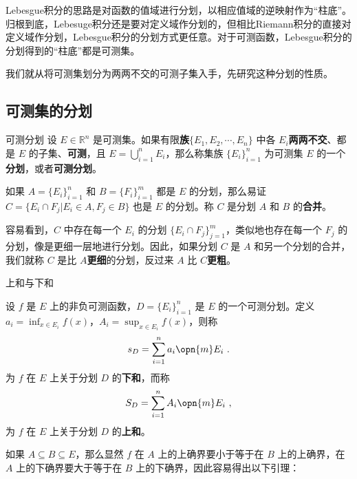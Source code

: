 

Lebesgue积分的思路是对函数的值域进行分划，以相应值域的逆映射作为“柱底”。归根到底，Lebesuge积分还是要对定义域作分划的，但相比Riemann积分的直接对定义域作分划，Lebesgue积分的分划方式更任意。对于可测函数，Lebesgue积分的分划得到的“柱底”都是可测集。

我们就从将可测集划分为两两不交的可测子集入手，先研究这种分划的性质。

\subsection{可测集的分划}



\begin{definition}{可测分划}
设 $E\in\mathbb{R}^n$ 是可测集。如果有限\textbf{族}$\{E_1, E_2, \cdots, E_n\}$ 中各 $E_i$\textbf{两两不交}、都是 $E$ 的子集、\textbf{可测}，且 $E=\bigcup^n_{i=1}E_i$，那么称集族 $\{E_i\}_{i=1}^n$ 为可测集 $E$ 的一个\textbf{分划}，或者\textbf{可测分划}。
\end{definition}

如果 $A=\{E_i\}_{i=1}^n$ 和 $B=\{F_i\}_{i=1}^m$ 都是 $E$ 的分划，那么易证 $C=\{E_i\cap F_j|E_i\in A, F_j\in B\}$ 也是 $E$ 的分划。称 $C$ 是分划 $A$ 和 $B$ 的\textbf{合并}。

容易看到，$C$ 中存在每一个 $E_i$ 的分划 $\{E_i\cap F_j\}_{j=1}^m$，类似地也存在每一个 $F_j$ 的分划，像是更细一层地进行分划。因此，如果分划 $C$ 是 $A$ 和另一个分划的合并，我们就称 $C$ 是比 $A$\textbf{更细}的分划，反过来 $A$ 比 $C$\textbf{更粗}。

\begin{definition}{上和与下和}

设 $f$ 是 $E$ 上的非负可测函数，$D=\{E_i\}_{i=1}^n$ 是 $E$ 的一个可测分划。定义 $a_i=\inf_{x\in E_i}f(x)$，$A_i=\sup_{x\in E_i}f(x)$，则称
\begin{equation}
s_D=\sum_{i=1}^n a_i \opn{m}E_i~.
\end{equation}
为 $f$ 在 $E$ 上关于分划 $D$ 的\textbf{下和}，而称
\begin{equation}
S_D=\sum_{i=1}^n A_i \opn{m}E_i~,
\end{equation}
为 $f$ 在 $E$ 上关于分划 $D$ 的\textbf{上和}。

\end{definition}

如果 $A\subseteq B\subseteq E$，那么显然 $f$ 在 $A$ 上的上确界要小于等于在 $B$ 上的上确界，在 $A$ 上的下确界要大于等于在 $B$ 上的下确界，因此容易得出以下引理：

